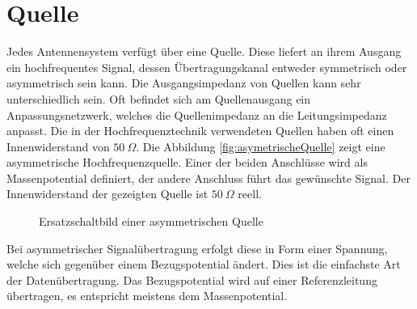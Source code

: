 \section{Quelle}
Jedes Antennensystem verfügt über eine Quelle. Diese liefert an ihrem Ausgang ein hochfrequentes Signal, dessen Übertragungskanal entweder symmetrisch oder asymmetrisch sein kann. Die Ausgangsimpedanz von Quellen kann sehr unterschiedlich sein. Oft befindet sich am Quellenausgang ein Anpassungsnetzwerk, welches die Quellenimpedanz an die Leitungsimpedanz anpasst. Die in der Hochfrequenztechnik verwendeten Quellen haben oft einen Innenwiderstand von $50\ \Omega$. Die Abbildung \ref{fig:asymetrischeQuelle} zeigt eine asymmetrische  Hochfrequenzquelle. Einer der beiden Anschlüsse wird als Massenpotential definiert, der andere Anschluss führt das gewünschte Signal. Der Innenwiderstand der gezeigten Quelle ist $50\ \Omega$ reell.
\begin{figure}[!th]
	\begin{center}
	\end{center}
\caption{Ersatzschaltbild einer asymmetrischen Quelle}
\label{fig:asymmetrischeQuelle}
\end{figure}
Bei asymmetrischer Signalübertragung erfolgt diese in Form einer Spannung, welche sich gegenüber einem Bezugspotential ändert. Dies ist die einfachste Art der Datenübertragung. Das Bezugspotential wird auf einer Referenzleitung übertragen, es entspricht meistens dem Massenpotential. \\

